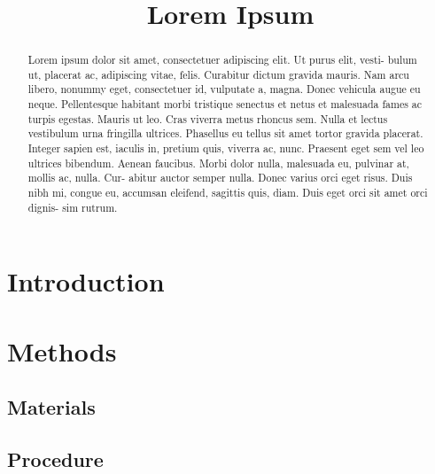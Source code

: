 \documentclass[a4paper,12pt]{hlsart}
\title{Lorem Ipsum}
\begin{document}
\maketitle
\begin{abstract}
  Lorem ipsum dolor sit amet, consectetuer adipiscing elit. Ut purus elit,
  vesti- bulum ut, placerat ac, adipiscing vitae, felis. Curabitur dictum
  gravida mauris. Nam arcu libero, nonummy eget, consectetuer id, vulputate
  a, magna. Donec vehicula augue eu neque. Pellentesque habitant morbi
  tristique senectus et netus et malesuada fames ac turpis egestas. Mauris ut
  leo. Cras viverra metus rhoncus sem. Nulla et lectus vestibulum urna
  fringilla ultrices. Phasellus eu tellus sit amet tortor gravida placerat.
  Integer sapien est, iaculis in, pretium quis, viverra ac, nunc. Praesent
  eget sem vel leo ultrices bibendum. Aenean faucibus. Morbi dolor nulla,
  malesuada eu, pulvinar at, mollis ac, nulla. Cur- abitur auctor semper
  nulla. Donec varius orci eget risus. Duis nibh mi, congue eu, accumsan
  eleifend, sagittis quis, diam. Duis eget orci sit amet orci dignis- sim
  rutrum.
\end{abstract}

\section{Introduction}
\lipsum[2-3]

\section{Methods}
\subsection{Materials}
\lipsum[4-5]

\subsection{Procedure}
\lipsum[5-6]
\end{document}
